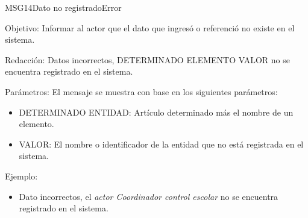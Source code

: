 \begin{mensaje}{MSG14}{Dato no registrado}{Error}
	\item [Objetivo:] Informar al actor que el dato que ingresó o referenció no existe en el sistema.
	\item[Redacción:] Datos incorrectos, DETERMINADO ELEMENTO VALOR no se encuentra registrado en el sistema.
	\item[Parámetros:] El mensaje se muestra con base en los siguientes parámetros:
	\begin{itemize}
		\item DETERMINADO ENTIDAD: Artículo determinado más el nombre de un elemento.
		\item VALOR: El nombre o identificador de la entidad que no está registrada en el sistema.
	\end{itemize}
	\item[Ejemplo:] \begin{itemize}
		\item Dato incorrectos, el {\em actor Coordinador control escolar} no se encuentra registrado en el sistema.
	\end{itemize}
\end{mensaje}